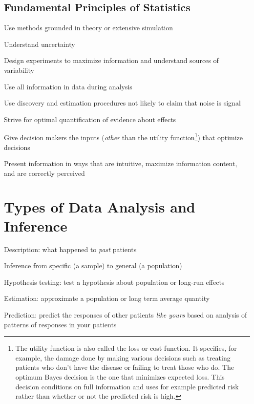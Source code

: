 \subsection{Fundamental Principles of Statistics}
\bi
\item Use methods grounded in theory or extensive simulation
\item Understand uncertainty
\item Design experiments to maximize information and understand
  sources of variability
\item Use all information in data during analysis
\item Use discovery and estimation procedures not likely to claim that
  noise is signal
\item Strive for optimal quantification of evidence about effects
\item Give decision makers the inputs (\emph{other} than the utility
  function\footnote{The utility function is also called the loss or
    cost function.  It specifies, for example, the damage done by
    making various decisions such as treating patients who don't have
    the disease or failing to treat those who do.  The optimum Bayes
    decision is the one that minimizes expected loss.  This decision
    conditions on full information and uses for example predicted risk
    rather than whether or not the predicted risk is high.}) that
  optimize decisions
\item Present information in ways that are intuitive, maximize
  information content, and are correctly perceived
\ei


\section{Types of Data Analysis and Inference}
 \bi
 \item Description: what happened to \emph{past} patients
 \item Inference from specific (a sample) to general (a population)
 \bi
  \item Hypothesis testing: test a hypothesis about population or
   long-run effects
  \item Estimation: approximate a population or long term average
   quantity
  \item Prediction: predict the responses of other patients \emph{like yours}
   based on analysis of patterns of responses in your patients
  \ei
\ei

